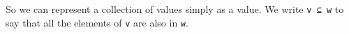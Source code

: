 \begin{fence}
\begin{code}%
\>[0]\AgdaSpace{}%
\AgdaSpace{}%
\<%
\\
%
\\[\AgdaEmptyExtraSkip]%
\>[0]\AgdaSpace{}%
\AgdaSymbol{:}\AgdaSpace{}%
\AgdaSpace{}%
\AgdaSpace{}%
\AgdaSpace{}%
\AgdaSpace{}%
\<%
\\
\>[0]\AgdaSpace{}%
\AgdaSpace{}%
\AgdaSpace{}%
\AgdaSymbol{=}\AgdaSpace{}%
\AgdaSpace{}%
\AgdaSpace{}%
\<%
\\
\>[0]\AgdaSpace{}%
\AgdaSpace{}%
\AgdaSpace{}%
\AgdaSpace{}%
\AgdaSpace{}%
\AgdaSymbol{=}\AgdaSpace{}%
\AgdaSpace{}%
\AgdaSpace{}%
\AgdaSpace{}%
\AgdaSpace{}%
\<%
\\
\>[0]\AgdaSpace{}%
\AgdaSpace{}%
\AgdaSymbol{(}\AgdaSpace{}%
\AgdaSpace{}%
\AgdaSymbol{)}\AgdaSpace{}%
\AgdaSymbol{=}\AgdaSpace{}%
\AgdaSpace{}%
\AgdaSpace{}%
\AgdaSpace{}%
\AgdaSpace{}%
\AgdaSpace{}%
\AgdaSpace{}%
\<%
\end{code}
\end{fence}

So we can represent a collection of values simply as a value. We write
\texttt{v\ ⊆\ w} to say that all the elements of \texttt{v} are also in
\texttt{w}.

